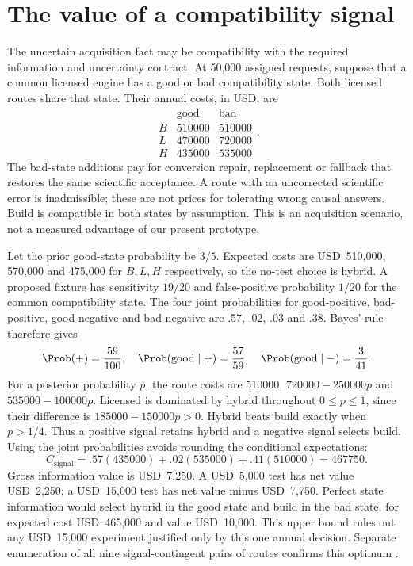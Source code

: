 \section{The value of a compatibility signal}
\label{exec17:s8-signal}

The uncertain acquisition fact may be compatibility with the required
information and uncertainty contract. At 50,000 assigned requests, suppose
that a common licensed engine has a good or bad compatibility state. Both
licensed routes share that state. Their annual costs, in USD, are
\begin{equation}
\begin{array}{c|rr}
 & \text{good} & \text{bad}\\ \hline
 B&510000&510000\\
 L&470000&720000\\
 H&435000&535000
\end{array}.
\label{exec17:s8-signal-cost-table}
\end{equation}
The bad-state additions pay for conversion repair, replacement or fallback
that restores the same scientific acceptance. A route with an uncorrected
scientific error is inadmissible; these are not prices for tolerating wrong
causal answers. Build is compatible in both states by assumption. This is an
acquisition scenario, not a measured advantage of our present prototype.

Let the prior good-state probability be $3/5$. Expected costs are USD~510,000,
570,000 and 475,000 for $B,L,H$ respectively, so the no-test choice is hybrid.
A proposed fixture has sensitivity $19/20$ and false-positive probability
$1/20$ for the common compatibility state. The four joint probabilities for
good-positive, bad-positive, good-negative and bad-negative are .57, .02, .03
and .38. Bayes' rule therefore gives
\begin{equation}
 \Prob(+)=\frac{59}{100},\quad
 \Prob(\mathrm{good}\mid +)=\frac{57}{59},\quad
 \Prob(\mathrm{good}\mid -)=\frac{3}{41}.
 \label{exec17:s8-signal-posterior}
\end{equation}
For a posterior probability $p$, the route costs are
$510000$, $720000-250000p$ and $535000-100000p$.
Licensed is dominated by hybrid throughout $0\leq p\leq1$, since their
difference is $185000-150000p>0$. Hybrid beats build exactly when $p>1/4$.
Thus a positive signal retains hybrid and a negative signal selects build.
Using the joint probabilities avoids rounding the conditional expectations:
\begin{equation}
 C_{\mathrm{signal}}=.57(435000)+.02(535000)+.41(510000)=467750.
 \label{exec17:s8-signal-value}
\end{equation}
Gross information value is USD~7,250. A USD~5,000 test has net value
USD~2,250; a USD~15,000 test has net value minus USD~7,750. Perfect state
information would select hybrid in the good state and build in the bad state,
for expected cost USD~465,000 and value USD~10,000. This upper bound rules out
any USD~15,000 experiment justified only by this one annual decision. Separate enumeration of all nine
signal-contingent pairs of routes confirms this optimum \citep{exec17_s8_examples}.

